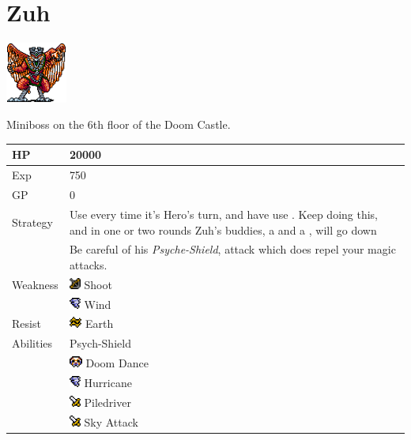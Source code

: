 \section{Zuh}
\label{monster:zuh}

\includegraphics[height=2cm,keepaspectratio]{./resources/monster/zuh}

Miniboss on the 6th floor of the Doom Castle.

\begin{longtable}{ l p{9cm} }
	HP
	& 20000
\\ \hline
	Exp
	& 750
\\ \hline
	GP
	& 0
\\ \hline
	Strategy
	& Use \nameref{spell:flare} every time it's Hero's turn, and have \nameref{char:phoebe} use \nameref{spell:white}. Keep doing this, and in one or two rounds Zuh's buddies, a \nameref{monster:chimera} and a \nameref{monster:thanatos}, will go down \\
	& Be careful of his \textit{Psyche-Shield}, attack which does repel your magic attacks.
\\ \hline
	Weakness
	& \includegraphics[height=1em,keepaspectratio]{./resources/effects/shoot} Shoot \\
	& \includegraphics[height=1em,keepaspectratio]{./resources/effects/wind} Wind
\\ \hline
	Resist
	& \includegraphics[height=1em,keepaspectratio]{./resources/effects/earth} Earth
\\ \hline
	Abilities
	& Psych-Shield \\
	& \includegraphics[height=1em,keepaspectratio]{./resources/effects/fatal} Doom Dance \\
	& \includegraphics[height=1em,keepaspectratio]{./resources/effects/wind} Hurricane \\
	& \includegraphics[height=1em,keepaspectratio]{./resources/effects/damage} Piledriver \\
	& \includegraphics[height=1em,keepaspectratio]{./resources/effects/damage} Sky Attack
\end{longtable}
